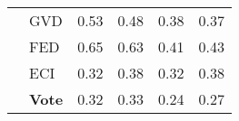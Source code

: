 \begin{tabularx}{\linewidth}{*{6}{X}}
 & GVD & {\cellcolor[HTML]{BC141A}} \color[HTML]{F1F1F1} 0.53 & {\cellcolor[HTML]{1F6EB3}} \color[HTML]{F1F1F1} 0.48  & {\cellcolor[HTML]{F6583E}} \color[HTML]{F1F1F1} 0.38 & {\cellcolor[HTML]{4B98CA}} \color[HTML]{F1F1F1} 0.37 \\
 & FED & {\cellcolor[HTML]{67000D}} \color[HTML]{F1F1F1} 0.65 & {\cellcolor[HTML]{08306B}} \color[HTML]{F1F1F1} 0.63  & {\cellcolor[HTML]{F14432}} \color[HTML]{F1F1F1} 0.41 & {\cellcolor[HTML]{3383BE}} \color[HTML]{F1F1F1} 0.43 \\
 & ECI & {\cellcolor[HTML]{FB7A5A}} \color[HTML]{F1F1F1} 0.32 & {\cellcolor[HTML]{4997C9}} \color[HTML]{F1F1F1} 0.38  & {\cellcolor[HTML]{FB7A5A}} \color[HTML]{F1F1F1} 0.32 & {\cellcolor[HTML]{4997C9}} \color[HTML]{F1F1F1} 0.38 \\
 & \textbf{Vote} & {\cellcolor[HTML]{FB7A5A}} \color[HTML]{F1F1F1} 0.32 & {\cellcolor[HTML]{60A7D2}} \color[HTML]{F1F1F1} 0.33  & {\cellcolor[HTML]{FCAB8F}} \color[HTML]{000000} 0.24 & {\cellcolor[HTML]{89BEDC}} \color[HTML]{000000} 0.27 \\
\bottomrule
\end{tabularx}
